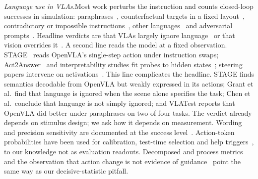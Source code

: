 \documentclass[conference]{IEEEtran}
\newcommand{\head}[1]{\textit{#1}\hspace{0.4em}}
\begin{document}
\head{Language use in VLAs.}Most work perturbs the instruction and counts closed-loop successes in simulation: paraphrases~\cite{wang2024ladev,wang2025vlatest,fei2025liberoplus,zhou2025liberopro,kim2026liberopara}, counterfactual targets in a fixed layout~\cite{fang2026liberocf,hou2026langgap,zhao2026instructmove,xu2026better}, contradictory or impossible instructions~\cite{zhang2026icbench,hou2026conflictvla,hsieh2025dowhat}, other languages~\cite{kirouane2026measuring,dong2026language,chen2026beyond} and adversarial prompts~\cite{jones2025adversarial,srikanth2026redteaming,tong2026uncovering}. Headline verdicts are that VLAs largely ignore language~\cite{fei2025liberoplus,hou2026langgap} or that vision overrides it~\cite{fang2026liberocf}. A second line reads the model at a fixed observation. STAGE~\cite{jin2026stage} reads OpenVLA's single-step action under instruction swaps; Act2Answer~\cite{kachaev2026act2answer} and interpretability studies fit probes to hidden states~\cite{lu2025probing,grant2026features,shi2026vlatrace,chen2026instructions}; steering papers intervene on activations~\cite{haon2025mechanistic,swann2026sparse,buurmeijer2026observing}. This line complicates the headline. STAGE finds semantics decodable from OpenVLA but weakly expressed in its actions; Grant et al.\ find that language is ignored when the scene alone specifies the task; Chen et al.\ conclude that language is not simply ignored; and VLATest reports that OpenVLA did better under paraphrases on two of four tasks. The verdict already depends on stimulus design; we ask how it depends on measurement. Wording and precision sensitivity are documented at the success level~\cite{kim2026liberopara,wang2024ladev,wang2025vlatest,gao2026taxonomy,xu2026vlaquantbench}. Action-token probabilities have been used for calibration, test-time selection and help triggers~\cite{zollo2025confidence,jang2026verifier,karli2025insight}, to our knowledge not as evaluation readouts. Decomposed and process metrics~\cite{emukpere2026robust,yu2026robosemanticbench,hou2026conflictvla} and the observation that action change is not evidence of guidance~\cite{zhang2026memory} point the same way as our decisive-statistic pitfall.
\end{document}
